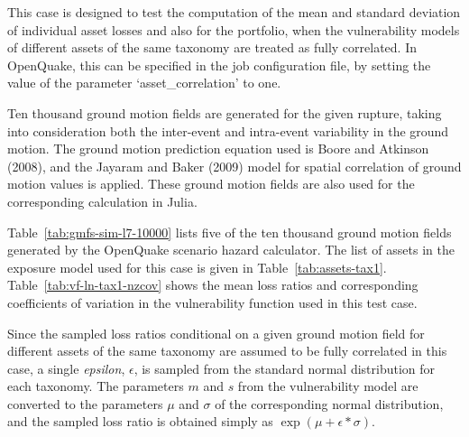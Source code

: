 This case is designed to test the computation of the mean and standard deviation of individual asset losses and also for the portfolio, when the vulnerability models of different assets of the same taxonomy are treated as fully correlated. In OpenQuake, this can be specified in the job configuration file, by setting the value of the parameter `asset\_correlation' to one.

Ten thousand ground motion fields are generated for the given rupture, taking into consideration both the inter-event and intra-event variability in the ground motion. The ground motion prediction equation used is Boore and Atkinson (2008), and the Jayaram and Baker (2009) model for spatial correlation of ground motion values is applied. These ground motion fields are also used for the corresponding calculation in Julia.

Table~\ref{tab:gmfs-sim-l7-10000} lists five of the ten thousand ground motion fields generated by the OpenQuake scenario hazard calculator. The list of assets in the exposure model used for this case is given in Table~\ref{tab:assets-tax1}. Table~\ref{tab:vf-ln-tax1-nzcov} shows the mean loss ratios and corresponding coefficients of variation in the vulnerability function used in this test case.

Since the sampled loss ratios conditional on a given ground motion field for different assets of the same taxonomy are assumed to be fully correlated in this case, a single \emph{epsilon}, $\epsilon$,  is sampled from the standard normal distribution for each taxonomy. The parameters $m$ and $s$ from the vulnerability model are converted to the parameters $\mu$ and $\sigma$ of the corresponding normal distribution, and the sampled loss ratio is obtained simply as $\exp (\mu + \epsilon * \sigma)$.